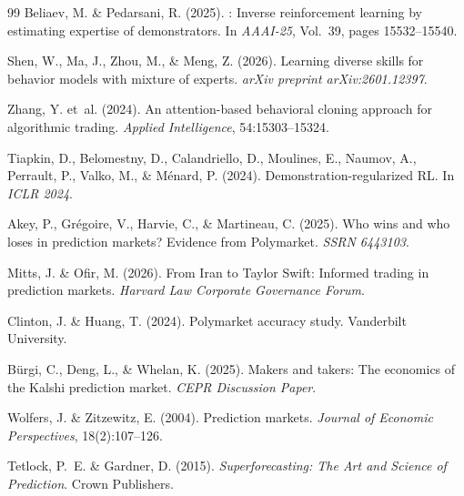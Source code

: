 \documentclass[a4paper, 11pt]{article}
\begin{document}
\begin{thebibliography}{99}
Beliaev, M. \& Pedarsani, R. (2025).
: Inverse reinforcement learning by estimating expertise of demonstrators.
\newblock In \emph{AAAI-25}, Vol.~39, pages 15532--15540.

Shen, W., Ma, J., Zhou, M., \& Meng, Z. (2026).
\newblock Learning diverse skills for behavior models with mixture of experts.
\newblock \emph{arXiv preprint arXiv:2601.12397}.

Zhang, Y. et~al. (2024).
\newblock An attention-based behavioral cloning approach for algorithmic trading.
\newblock \emph{Applied Intelligence}, 54:15303--15324.

Tiapkin, D., Belomestny, D., Calandriello, D., Moulines, E., Naumov, A., Perrault, P., Valko, M., \& M\'enard, P. (2024).
\newblock Demonstration-regularized {RL}.
\newblock In \emph{ICLR 2024}.

Akey, P., Gr\'egoire, V., Harvie, C., \& Martineau, C. (2025).
\newblock Who wins and who loses in prediction markets? Evidence from {Polymarket}.
\newblock \emph{SSRN 6443103}.

Mitts, J. \& Ofir, M. (2026).
\newblock From Iran to Taylor Swift: Informed trading in prediction markets.
\newblock \emph{Harvard Law Corporate Governance Forum}.

Clinton, J. \& Huang, T. (2024).
\newblock Polymarket accuracy study.
\newblock Vanderbilt University.

B\"urgi, C., Deng, L., \& Whelan, K. (2025).
\newblock Makers and takers: The economics of the Kalshi prediction market.
\newblock \emph{CEPR Discussion Paper}.

Wolfers, J. \& Zitzewitz, E. (2004).
\newblock Prediction markets.
\newblock \emph{Journal of Economic Perspectives}, 18(2):107--126.

Tetlock, P.~E. \& Gardner, D. (2015).
\newblock \emph{Superforecasting: The Art and Science of Prediction}.
\newblock Crown Publishers.

\end{thebibliography}
\end{document}
